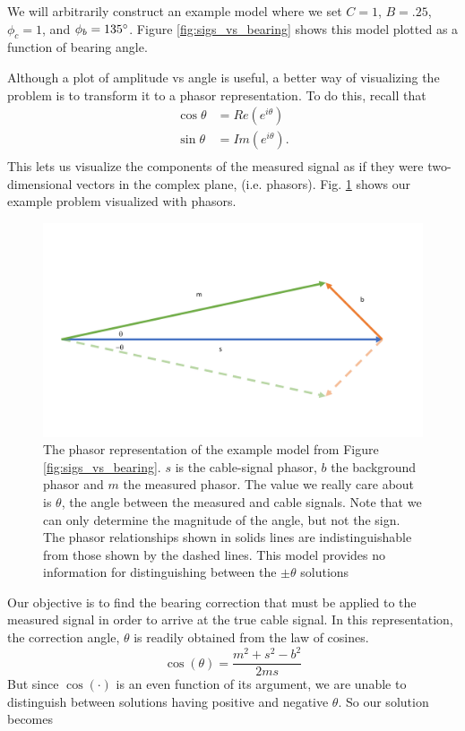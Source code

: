 \documentclass[paper=a4, fontsize=11pt]{scrartcl}
\numberwithin{equation}{section}		%
\numberwithin{figure}{section}			%
\numberwithin{table}{section}				%
\begin{document}
\begin{appendices}
We will arbitrarily construct an example model where we set $C=1$, $B=.25$, $\phi_c=1$, and $\phi_b=135\degree$. Figure \ref{fig:sigs_vs_bearing} shows this model plotted as a function of bearing angle.

Although a plot of amplitude vs angle is useful, a better way of visualizing the problem is to transform it to a phasor representation.  To do this, recall that
\begin{align}
        \cos{\theta} &= Re\left(e^{i\theta}\right) \\
        \sin{\theta} &= Im\left(e^{i\theta}\right). \\
\end{align}
This lets us visualize the components of the measured signal as if they were two-dimensional vectors in the complex plane, (i.e. phasors). Fig. \ref{fig:phasor_base} shows our example problem visualized with phasors.

\begin{figure}[h]
  \caption{
  The phasor representation of the example model from Figure \ref{fig:sigs_vs_bearing}. $s$ is the cable-signal phasor, $b$ the background phasor and $m$ the measured phasor.  The value we really care about is $\theta$, the angle between the measured and cable signals.  Note that we can only determine the magnitude of the angle, but not the sign.  The phasor relationships shown in solids lines are indistinguishable from those shown by the dashed lines.  This model provides no information for distinguishing between the $\pm\theta$ solutions}
  \label{fig:phasor_base}
  \centering
  \includegraphics[width=1.0\textwidth]{figures/phasor_base.pdf}
\end{figure}
Our objective is to find the bearing correction that must be applied to the measured signal in order to arrive at the true cable signal. In this representation, the correction angle, $\theta$ is readily obtained from the law of cosines.
\begin{equation} \label{eq:law_of_cos}
    \cos\left(\theta\right) = \frac{m^2 + s^2 - b^2}{2ms}
\end{equation}
But since $\cos\left(\cdot\right)$ is an even function of its argument, we are unable to distinguish between solutions having positive and negative $\theta$.  So our solution becomes


\end{appendices}
\end{document}

